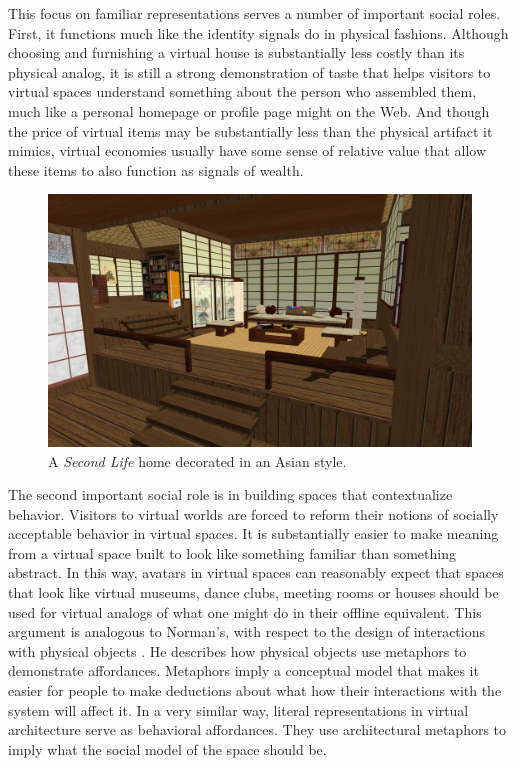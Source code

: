 This focus on familiar representations serves a number of important social roles. First, it functions much like the identity signals do in physical fashions. Although choosing and furnishing a virtual house is substantially less costly than its physical analog, it is still a strong demonstration of taste that helps visitors to virtual spaces understand something about the person who assembled them, much like a personal homepage or profile page might on the Web. And though the price of virtual items may be substantially less than the physical artifact it mimics, virtual economies usually have some sense of relative value that allow these items to also function as signals of wealth.

\begin{figure}[t]
	\includegraphics{figures/asian_home.png}
	\caption{A \emph{Second Life} home decorated in an Asian style.}
	\label{fig:asian_home}
\end{figure}

The second important social role is in building spaces that contextualize behavior. Visitors to virtual worlds are forced to reform their notions of socially acceptable behavior in virtual spaces. It is substantially easier to make meaning from a virtual space built to look like something familiar than something abstract. In this way, avatars in virtual spaces can reasonably expect that spaces that look like virtual museums, dance clubs, meeting rooms or houses should be used for virtual analogs of what one might do in their offline equivalent. This argument is analogous to Norman's, with respect to the design of interactions with physical objects \citep{Norman:2002tv}. He describes how physical objects use metaphors to demonstrate affordances. Metaphors imply a conceptual model that makes it easier for people to make deductions about what how their interactions with the system will affect it. In a very similar way, literal representations in virtual architecture serve as behavioral affordances. They use architectural metaphors to imply what the social model of the space should be. 

